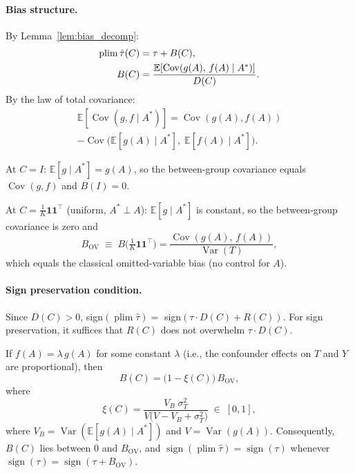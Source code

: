\paragraph{Bias structure.}
By Lemma~\ref{lem:bias_decomp}:
\begin{align}
  \operatorname{plim}\hat\tau(C) &= \tau + B(C),\notag\\
  B(C) &= \frac{\mathbb{E}[\operatorname{Cov}(g(A),\,f(A)\mid A^*)]}{D(C)}.
  \label{eq:bias_conf}
\end{align}
By the law of total covariance:
\begin{multline}
  \mathbb{E}[\operatorname{Cov}(g,f\mid A^*)]
  = \operatorname{Cov}(g(A),f(A))\\
  - \operatorname{Cov}\bigl(\mathbb{E}[g(A)\mid A^*],\;\mathbb{E}[f(A)\mid A^*]\bigr).
  \label{eq:lotc}
\end{multline}

At $C=I$: $\mathbb{E}[g\mid A^*]=g(A)$, so the between-group covariance equals $\operatorname{Cov}(g,f)$ and $B(I)=0$.

At $C=\frac{1}{K}\mathbf{1}\mathbf{1}^\top$ (uniform, $A^*\perp A$): $\mathbb{E}[g\mid A^*]$ is constant, so the between-group covariance is zero and
\begin{equation}
  B_{\mathrm{OV}} \;\equiv\; B\bigl(\tfrac{1}{K}\mathbf{1}\mathbf{1}^\top\bigr)
  = \frac{\operatorname{Cov}(g(A),\,f(A))}{\operatorname{Var}(T)},
  \label{eq:bov}
\end{equation}
which equals the classical omitted-variable bias (no control for $A$).

\paragraph{Sign preservation condition.}
Since $D(C)>0$, sign$(\operatorname{plim}\hat\tau) = $ sign$(\tau\cdot D(C) + R(C))$.
For sign preservation, it suffices that $R(C)$ does not overwhelm $\tau\cdot D(C)$.

\begin{proposition}
\label{prop:conf_prop}
If $f(A) = \lambda\,g(A)$ for some constant $\lambda$ (i.e., the confounder effects on $T$ and $Y$ are proportional), then
\begin{equation}
  B(C) = \bigl(1-\xi(C)\bigr)\,B_{\mathrm{OV}},
  \label{eq:convex}
\end{equation}
where
\[
  \xi(C) = \frac{V_B\;\sigma_T^2}
  {V\bigl(V-V_B+\sigma_T^2\bigr)}
  \;\in\;[0,1],
\]
where $V_B=\operatorname{Var}(\mathbb{E}[g(A)\mid A^*])$ and $V=\operatorname{Var}(g(A))$.
Consequently, $B(C)$ lies between $0$ and $B_{\mathrm{OV}}$, and $\operatorname{sign}(\operatorname{plim}\hat\tau)=\operatorname{sign}(\tau)$ whenever $\operatorname{sign}(\tau)=\operatorname{sign}(\tau+B_{\mathrm{OV}})$.
\end{proposition}

